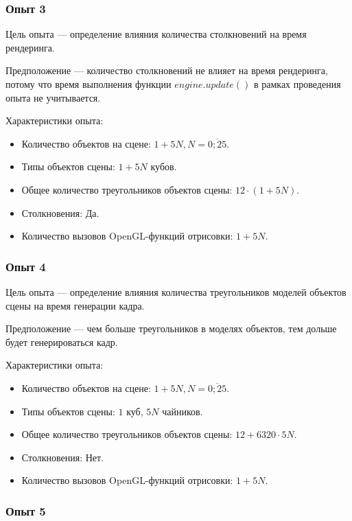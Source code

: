 \subsubsection{Опыт 3}

Цель опыта --- определение влияния количества столкновений на время рендеринга.

Предположение --- количество столкновений не влияет на время рендеринга, потому что время выполнения функции $engine.update()$ в рамках проведения опыта не учитывается.

Характеристики опыта:
\begin{itemize}
    \item Количество объектов на сцене: $1 + 5 N, N = \overline{0; 25}$.
    \item Типы объектов сцены: $1 + 5 N$ кубов.
    \item Общее количество треугольников объектов сцены: $12 \cdot (1 + 5 N)$.
    \item Столкновения: Да.
    \item Количество вызовов OpenGL-функций отрисовки: $1 + 5 N$.
\end{itemize}

\subsubsection{Опыт 4}

Цель опыта --- определение влияния количества треугольников моделей объектов сцены на время генерации кадра.

Предположение --- чем больше треугольников в моделях объектов, тем дольше будет генерироваться кадр.

Характеристики опыта:
\begin{itemize}
    \item Количество объектов на сцене: $1 + 5 N, N = \overline{0; 25}$.
    \item Типы объектов сцены: $1$ куб, $5 N$ чайников.
    \item Общее количество треугольников объектов сцены: $12 + 6320 \cdot 5 N$.
    \item Столкновения: Нет.
    \item Количество вызовов OpenGL-функций отрисовки: $1 + 5 N$.
\end{itemize}

\subsubsection{Опыт 5}

